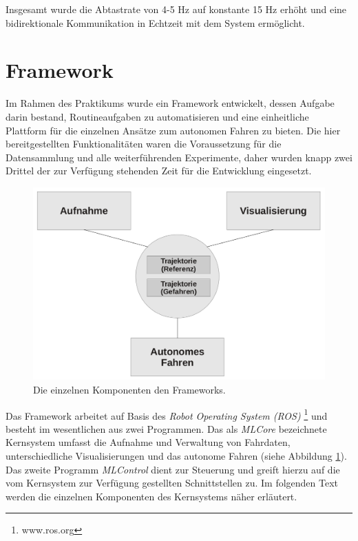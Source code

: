 Insgesamt wurde die Abtastrate von 4-5 Hz auf konstante 15 Hz erhöht und eine bidirektionale Kommunikation in Echtzeit mit dem System ermöglicht.


\section{Framework} %
\label{sub:Framework}
Im Rahmen des Praktikums wurde ein Framework entwickelt, dessen Aufgabe darin bestand, Routineaufgaben zu automatisieren und eine einheitliche Plattform für die einzelnen Ansätze zum autonomen Fahren zu bieten. Die hier bereitgestellten Funktionalitäten waren die Voraussetzung für die Datensammlung und alle weiterführenden Experimente, daher wurden knapp zwei Drittel der zur Verfügung stehenden Zeit für die Entwicklung eingesetzt.

\begin{figure}[!h]
	\centering
	\includegraphics[scale=1.0]{images/framework/Framework Komponente.png} 
	\caption{Die einzelnen Komponenten den Frameworks.}
	\label{fig:FrameworkKomponente}
\end{figure}

Das Framework arbeitet auf Basis des \textit{Robot Operating System (ROS)} \footnote{www.ros.org} und besteht im wesentlichen aus zwei Programmen. Das als \textit{MLCore} bezeichnete Kernsystem umfasst die Aufnahme und Verwaltung von Fahrdaten, unterschiedliche Visualisierungen und das autonome Fahren (siehe Abbildung \ref{fig:FrameworkKomponente}). Das zweite Programm \textit{MLControl} dient zur Steuerung und greift hierzu auf die vom Kernsystem zur Verfügung gestellten Schnittstellen zu. Im folgenden Text werden die einzelnen Komponenten des Kernsystems näher erläutert.

